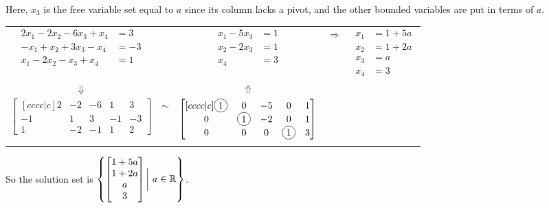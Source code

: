 \begin{applicationActivities}{3}{5}
\begin{example}
Here, \(x_3\) is the free variable set equal to \(a\) since its
column lacks a pivot, and the
other bounded variables are put in terms of \(a\).

\begin{center}
\begin{tabular}{ccccc}
$\begin{aligned}
2x_1-2x_2-6x_3+x_4 &= 3 \\
-x_1+x_2+3x_3-x_4 &= -3 \\
x_1-2x_2-x_3+x_4 &= 1
\end{aligned}$ & &
$\begin{aligned}
x_1-5x_3 &= 1 \\
x_2-2x_3 &= 1 \\
x_4 &= 3
\end{aligned}$ &\(\Rightarrow\)&
$\begin{aligned}
x_1 &= 1+5a \\
x_2 &= 1+2a \\
x_3 &= a \\
x_4 &= 3
\end{aligned}$
\\
$\Downarrow$ & & $\Uparrow$ \\
$\begin{bmatrix}[cccc|c]
{2} & -2 & -6 & 1 & 3 \\
-1 & 1 & 3 & -1 & -3 \\
1 & -2 & -1 & 1 & 2
\end{bmatrix}$  & $\sim$ &
$\begin{bmatrix}[cccc|c]
\circledNumber{1} & 0 & -5 & 0 & 1 \\
0 & \circledNumber{1} & -2 & 0  & 1 \\
0 & 0 & 0 & \circledNumber{1} & 3
\end{bmatrix}$ \\
 & & \\
\end{tabular}
\end{center}

So the solution set is $\left\{\begin{bmatrix} 1+5a \\ 1+2a \\ a \\ 3 \end{bmatrix} \bigg|\ a \in \mathbb{R} \right\}$.
\end{example}





\end{applicationActivities}
